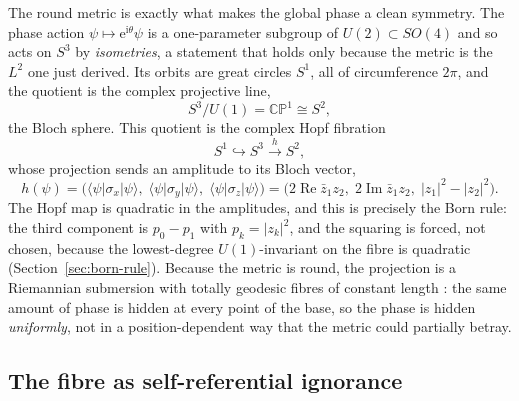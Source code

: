 \documentclass{article}
\begin{document}
The round metric is exactly what makes the global phase a clean symmetry. The
phase action $\psi\mapsto\mathrm{e}^{\mathrm{i}\theta}\psi$ is a one-parameter
subgroup of $U(2)\subset SO(4)$ and so acts on $S^{3}$ by \emph{isometries}, a
statement that holds only because the metric is the $L^{2}$ one just derived. Its
orbits are great circles $S^{1}$, all of circumference $2\pi$, and the quotient
is the complex projective line,
\begin{equation}
  S^{3}\big/U(1)=\mathbb{CP}^{1}\cong S^{2},
\end{equation}
the Bloch sphere. This quotient is the complex Hopf fibration
\autocite{Hopf1931, Urbantke2003, MosseriDandoloff2001}
\begin{equation}
  S^{1}\hookrightarrow S^{3}\xrightarrow{\;h\;}S^{2},
\end{equation}
whose projection sends an amplitude to its Bloch vector,
\begin{equation}
  h(\psi)=\bigl(\langle\psi\rvert\sigma_{x}\lvert\psi\rangle,\;
                 \langle\psi\rvert\sigma_{y}\lvert\psi\rangle,\;
                 \langle\psi\rvert\sigma_{z}\lvert\psi\rangle\bigr)
        =\bigl(2\operatorname{Re}\bar z_{1}z_{2},\;
               2\operatorname{Im}\bar z_{1}z_{2},\;
               \lvert z_{1}\rvert^{2}-\lvert z_{2}\rvert^{2}\bigr).
\end{equation}
The Hopf map is quadratic in the amplitudes, and this is precisely the Born rule:
the third component is $p_{0}-p_{1}$ with $p_{k}=\lvert z_{k}\rvert^{2}$, and the
squaring is forced, not chosen, because the lowest-degree $U(1)$-invariant on the
fibre is quadratic (Section~\ref{sec:born-rule}). Because the metric is round, the
projection is a Riemannian submersion with totally geodesic fibres of constant
length \autocite{GluckWarnerZiller1986}: the same amount of phase is hidden at
every point of the base, so the phase is hidden \emph{uniformly}, not in a
position-dependent way that the metric could partially betray.

\subsection{The fibre as self-referential ignorance}
\label{sec:fibre-self-ignorance}
\end{document}
